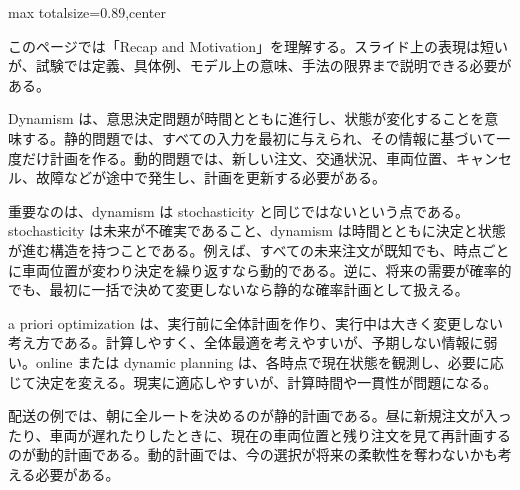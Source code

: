\begin{minipage}[t]{0.58\textwidth}
\begin{adjustbox}{max totalsize={\textwidth}{0.89\textheight},center}
\begin{minipage}{\textwidth}\scriptsize
{}このページでは「Recap and Motivation」を理解する。スライド上の表現は短いが、試験では定義、具体例、モデル上の意味、手法の限界まで説明できる必要がある。\par
Dynamism は、意思決定問題が時間とともに進行し、状態が変化することを意味する。静的問題では、すべての入力を最初に与えられ、その情報に基づいて一度だけ計画を作る。動的問題では、新しい注文、交通状況、車両位置、キャンセル、故障などが途中で発生し、計画を更新する必要がある。\par
重要なのは、dynamism は stochasticity と同じではないという点である。stochasticity は未来が不確実であること、dynamism は時間とともに決定と状態が進む構造を持つことである。例えば、すべての未来注文が既知でも、時点ごとに車両位置が変わり決定を繰り返すなら動的である。逆に、将来の需要が確率的でも、最初に一括で決めて変更しないなら静的な確率計画として扱える。\par
a priori optimization は、実行前に全体計画を作り、実行中は大きく変更しない考え方である。計算しやすく、全体最適を考えやすいが、予期しない情報に弱い。online または dynamic planning は、各時点で現在状態を観測し、必要に応じて決定を変える。現実に適応しやすいが、計算時間や一貫性が問題になる。\par
配送の例では、朝に全ルートを決めるのが静的計画である。昼に新規注文が入ったり、車両が遅れたりしたときに、現在の車両位置と残り注文を見て再計画するのが動的計画である。動的計画では、今の選択が将来の柔軟性を奪わないかも考える必要がある。\par

\end{minipage}
\end{adjustbox}
\end{minipage}

